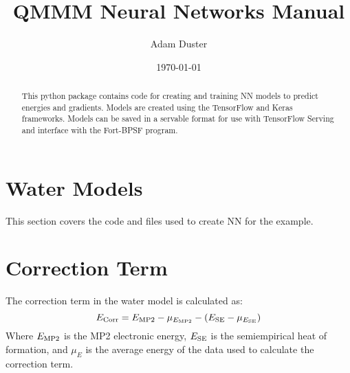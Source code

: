 \documentclass[12pt]{article}
\begin{document}
\title{QMMM Neural Networks Manual}
\author{Adam Duster}
\date{\today}
\maketitle

\begin{abstract}
This python package contains code for creating and training NN models to predict energies and gradients.
Models are created using the TensorFlow and Keras frameworks.
Models can be saved in a servable format for use with TensorFlow Serving and interface with the Fort-BPSF program.
\end{abstract}

\section{Water Models}
This section covers the code and files used to create NN for the example.

\section{Correction Term}
The correction term in the water model is calculated as:
\begin{equation}
	E_\mathrm{Corr} = E_{\mathrm{MP2}} - \mu_{E_{\mathrm{MP2}}} - (E_{\mathrm{SE}} - \mu_{E_{\mathrm{SE}}})
\end{equation}
Where $E_{\mathrm{MP2}}$ is the MP2 electronic energy, $E_{\mathrm{SE}}$ is the semiempirical heat of formation, and $\mu_{E}$ is the average energy of the data used to calculate the correction term.
\end{document}

